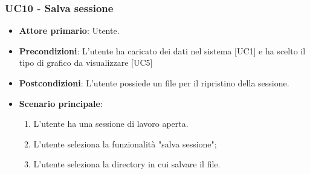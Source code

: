 \subsubsection{UC10 - Salva sessione}
\begin{itemize}
	\item \textbf{Attore primario}: Utente.
	\item \textbf{Precondizioni}: L'utente ha caricato dei dati nel sistema [UC1] e ha scelto il tipo di grafico da visualizzare [UC5]
	\item \textbf{Postcondizioni}: L'utente possiede un file  per il ripristino della sessione.
	\item \textbf{Scenario principale}:
		\begin{enumerate}
			\item L'utente ha una sessione di lavoro aperta.
			\item L'utente seleziona la funzionalità "salva sessione";
			\item L'utente seleziona la directory in cui salvare il file.
		\end{enumerate}
\end{itemize}